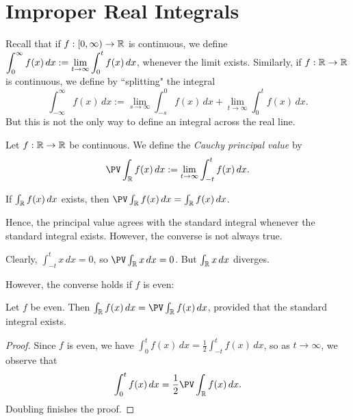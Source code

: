 \documentclass{article}
\begin{document}
\section{Improper Real Integrals}
Recall that if $f: [0, \infty)\to \mathbb R$ is continuous, we define $\displaystyle\int_0^\infty f(x)\, dx := \lim_{t\to \infty} \int_0^t f(x)\, dx$, whenever the limit exists. Similarly, if $f: \mathbb R\to \mathbb R$ is continuous, we define by ``splitting" the integral
$$\int_{-\infty}^\infty f(x)\, dx := \lim_{s\to\infty}\int_{-s}^0 f(x) \, dx + \lim_{t \to\infty} \int_0^t f(x)\, dx.$$
But this is not the only way to define an integral across the real line.
\begin{definition}
Let $f: \mathbb R\to\mathbb R$ be continuous. We define the \textit{Cauchy principal value} by
$$\PV\int_\R f(x)\, dx := \lim_{t\to\infty} \int_{-t}^t f(x)\, dx.$$
\end{definition}
\begin{lemma}
If $\int_\mathbb R f(x)\, dx$ exists, then $\PV \int_\R f(x)\, dx = \int_\R f(x)\, dx$.
\end{lemma}
Hence, the principal value agrees with the standard integral whenever the standard integral exists. However, the converse is not always true.
\begin{example}
Clearly, $\int_{-t}^t x\, dx = 0$, so $\PV\int_\R x\,dx = 0$. But $\int_\mathbb R x\, dx$ diverges.
\end{example}
However, the converse holds if $f$ is even:
\begin{proposition}
Let $f$ be even. Then $\int_\R f(x)\, dx = \PV \int_\R f(x)\, dx$, provided that the standard integral exists.
\end{proposition}
\begin{proof}
Since $f$ is even, we have $\int_0^t f(x)\, dx = \frac 12\int_{-t}^t f(x)\, dx$, so as $t\to \infty$, we observe that
$$\int_0^t f(x)\, dx = \frac 12\PV \int_\R f(x)\, dx.$$
Doubling finishes the proof.
\end{proof}
\end{document}
